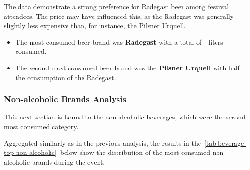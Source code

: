 The data demonstrate a strong preference for Radegast beer among festival attendees.
The price may have influenced this, as the Radegast was generally slightly less expensive than, for instance, the Pilsner Urquell.

\begin{keytakeaways}
	\begin{itemize}
		\item The most consumed beer brand was \textbf{Radegast} with a total of~~liters consumed.
		\item The second most consumed beer brand was the \textbf{Pilsner Urquell} with half the consumption of the Radegast.
	\end{itemize}
\end{keytakeaways}


\subsubsection{Non-alcoholic Brands Analysis}
\label{subsubsec:analysis-beverage-popular-non-alcoholic}

This next section is bound to the non-alcoholic beverages, which were the second most consumed category.

\begin{rqbox}
	\textit{}
\end{rqbox}

Aggregated similarly as in the previous analysis, the results in the~\autoref{tab:beverage-top-non-alcoholic}~below show the distribution of the most consumed non-alcoholic brands during the event.

